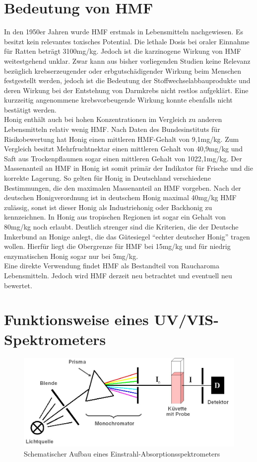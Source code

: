 \section{Bedeutung von HMF}
In den 1950er Jahren wurde HMF erstmals in Lebensmitteln nachgewiesen. Es besitzt kein relevantes toxisches Potential. Die lethale Dosis bei oraler Einnahme für Ratten beträgt 3100mg/kg. Jedoch ist die karzinogene Wirkung von HMF weitestgehend unklar. Zwar kann aus bisher vorliegenden Studien keine Relevanz bezüglich krebserzeugender oder erbgutschädigender Wirkung beim Menschen festgestellt werden, jedoch ist die Bedeutung der Stoffwechselabbauprodukte und deren Wirkung bei der Entstehung von Darmkrebs nicht restlos aufgeklärt. Eine kurzzeitig angenommene krebsvorbeugende Wirkung konnte ebenfalls nicht bestätigt werden.
\\
Honig enthält auch bei hohen Konzentrationen im Vergleich zu anderen Lebensmitteln relativ wenig HMF. Nach Daten des Bundesinstituts für Risikobewertung hat Honig einen mittleren HMF-Gehalt von 9,1mg/kg. Zum Vergleich besitzt Mehrfruchtnektar einen mittleren Gehalt von 40,9mg/kg und Saft aus Trockenpflaumen sogar einen mittleren Gehalt von 1022,1mg/kg. Der Massenanteil an HMF in Honig ist somit primär der Indikator für Frische und die korrekte Lagerung. So gelten für Honig in Deutschland verschiedene Bestimmungen, die den maximalen Massenanteil an HMF vorgeben. Nach der deutschen Honigverordnung ist in deutschem Honig maximal 40mg/kg HMF zulässig, sonst ist dieser Honig als Industriehonig oder Backhonig zu kennzeichnen. In Honig aus tropischen Regionen ist sogar ein Gehalt von 80mg/kg noch erlaubt. Deutlich strenger sind die Kriterien, die der Deutsche Imkerbund an Honige anlegt, die das Gütesiegel ``echter deutscher Honig'' tragen wollen. Hierfür liegt die Obergrenze für HMF bei 15mg/kg und für niedrig enzymatischen Honig sogar nur bei 5mg/kg.
\\
Eine direkte Verwendung findet HMF als Bestandteil von Raucharoma Lebensmitteln. Jedoch wird HMF derzeit neu betrachtet und eventuell neu bewertet.~\cite{BfR}

\section{Funktionsweise eines UV/VIS-Spektrometers}

\begin{figure}[htbp]
	\centering
		\includegraphics[width=1.00\textwidth]{../Bilder/Einstrahlspektrometer.jpg}
	\caption{Schematischer Aufbau eines Einstrahl-Absorptionsspektrometers \cite{Schema}}
	\label{fig:Einstrahlspektrometer}
\end{figure}

